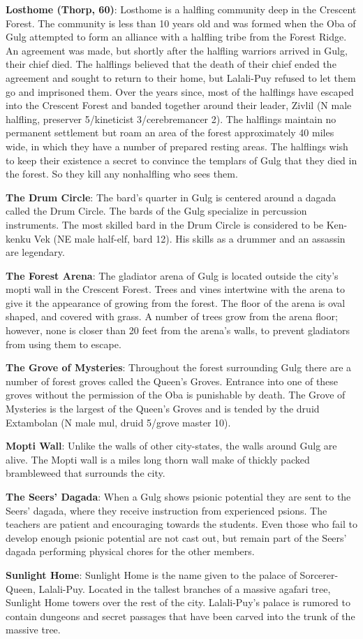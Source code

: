 {
	\textbf{Losthome (Thorp, 60)}: Losthome is a halfling community deep in the Crescent Forest. The community is less than 10 years old and was formed when the Oba of Gulg attempted to form an alliance with a halfling tribe from the Forest Ridge. An agreement was made, but shortly after the halfling warriors arrived in Gulg, their chief died. The halflings believed that the death of their chief ended the agreement and sought to return to their home, but Lalali-Puy refused to let them go and imprisoned them. Over the years since, most of the halflings have escaped into the Crescent Forest and banded together around their leader, Zivlil (N male halfling, preserver 5/kineticist 3/cerebremancer 2). The halflings maintain no permanent settlement but roam an area of the forest approximately 40 miles wide, in which they have a number of prepared resting areas. The halflings wish to keep their existence a secret to convince the templars of Gulg that they died in the forest. So they kill any nonhalfling who sees them.
}
{
	\textbf{The Drum Circle}: The bard's quarter in Gulg is centered around a dagada called the Drum Circle. The bards of the Gulg specialize in percussion instruments. The most skilled bard in the Drum Circle is considered to be Ken-kenku Vek (NE male half-elf, bard 12). His skills as a drummer and an assassin are legendary.

	\textbf{The Forest Arena}: The gladiator arena of Gulg is located outside the city's mopti wall in the Crescent Forest. Trees and vines intertwine with the arena to give it the appearance of growing from the forest. The floor of the arena is oval shaped, and covered with grass. A number of trees grow from the arena floor; however, none is closer than 20 feet from the arena's walls, to prevent gladiators from using them to escape.

	\textbf{The Grove of Mysteries}: Throughout the forest surrounding Gulg there are a number of forest groves called the Queen's Groves. Entrance into one of these groves without the permission of the Oba is punishable by death. The Grove of Mysteries is the largest of the Queen's Groves and is tended by the druid Extambolan (N male mul, druid 5/grove master 10).

	\textbf{Mopti Wall}: Unlike the walls of other city-states, the walls around Gulg are alive. The Mopti wall is a miles long thorn wall make of thickly packed brambleweed that surrounds the city.

	\textbf{The Seers' Dagada}: When a Gulg shows psionic potential they are sent to the Seers' dagada, where they receive instruction from experienced psions. The teachers are patient and encouraging towards the students. Even those who fail to develop enough psionic potential are not cast out, but remain part of the Seers' dagada performing physical chores for the other members.

	\textbf{Sunlight Home}: Sunlight Home is the name given to the palace of Sorcerer-Queen, Lalali-Puy. Located in the tallest branches of a massive agafari tree, Sunlight Home towers over the rest of the city. Lalali-Puy's palace is rumored to contain dungeons and secret passages that have been carved into the trunk of the massive tree.
}

